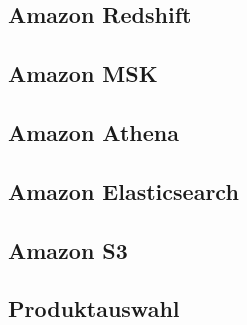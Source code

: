 \subsection{Amazon Redshift}

\subsection{Amazon MSK}

\subsection{Amazon Athena}

\subsection{Amazon Elasticsearch}

\subsection{Amazon S3}

\subsection{Produktauswahl}
